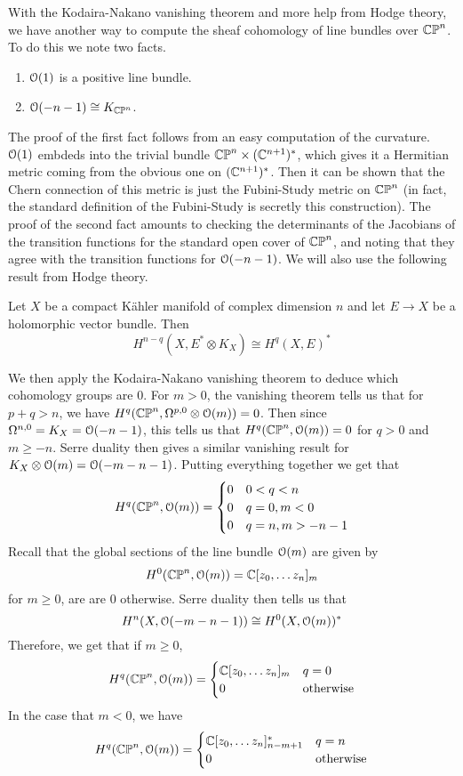 %
With the Kodaira-Nakano vanishing theorem and more help from Hodge theory, we have
another way to compute the sheaf cohomology of line bundles over $\mathbb{CP}^n$. To
do this we note two facts.
\begin{enumerate}
  \item $\mathcal{O}(1)$ is a positive line bundle.
  \item $\mathcal{O}(-n-1) \cong K_{\mathbb{CP}^n}$.
\end{enumerate}
%
The proof of the first fact follows from an easy computation of the curvature.
$\mathcal{O}(1)$ embdeds into the trivial bundle $\mathbb{CP}^n \times (\mathbb{C}^{n+1})^*$, which gives
it a Hermitian metric coming from the obvious one on $(\mathbb{C}^{n+1})^*$. Then it can be
shown that the Chern connection of this metric is just the Fubini-Study metric on
$\mathbb{CP}^n$ (in fact, the standard definition of the Fubini-Study is secretly
this construction). The proof of the second fact amounts to checking the
determinants of the Jacobians of the transition functions for the standard open
cover of $\mathbb{CP}^n$, and noting that they agree with the transition functions
for $\mathcal{O}(-n-1)$. We will also use the following result from Hodge theory.
%
\begin{thm}
Let $X$ be a compact K\"ahler manifold of complex dimension $n$ and let $E \to X$
be a holomorphic vector bundle.
Then
\[
H^{n-q}(X, E^*\otimes K_X) \cong H^q(X,E)^*
\]
\end{thm}
%
We then apply the Kodaira-Nakano vanishing theorem to deduce which cohomology
groups are $0$. For $m > 0$, the vanishing theorem tells us that for $p+q > n$, we have
$H^q(\mathbb{CP}^n,\Omega^{p,0} \otimes \mathcal{O}(m)) = 0$. Then since $\Omega^{n,0} = K_X = \mathcal{O}(-n-1)$,
this tells us that $H^q(\mathbb{CP}^n,\mathcal{O}(m)) = 0$ for $q > 0$ and $m \geq -n$. Serre duality
then gives a similar vanishing result for $K_X \otimes \mathcal{O}(m) = \mathcal{O}(-m-n-1)$.
Putting everything together we get that
\[
H^q(\mathbb{CP}^n,\mathcal{O}(m)) = \begin{cases}
0 & 0 < q < n \\
0 & q = 0, m < 0 \\
0 & q = n , m > -n-1
\end{cases}
\]
Recall that the global sections of the line bundle $\mathcal{O}(m)$ are given by
\[
H^0(\mathbb{CP}^n,\mathcal{O}(m)) = \mathbb{C}[z_0,\ldots z_n]_m
\]
for $m \geq 0$, are are $0$ otherwise. Serre duality then tells us that
\[
H^n(X, \mathcal{O}(-m - n - 1)) \cong H^0(X,\mathcal{O}(m))^*
\]
Therefore, we get that if $m \geq 0$,
\[
H^q(\mathbb{CP}^n, \mathcal{O}(m)) = \begin{cases}
\mathbb{C}[z_0,\ldots z_n]_m & q = 0 \\
0 & \text{otherwise}
\end{cases}
\]
In the case that $m < 0$, we have
\[
H^q(\mathbb{CP}^n, \mathcal{O}(m)) = \begin{cases}
\mathbb{C}[z_0,\ldots z_n]_{n-m+1}^* & q = n \\
0 & \text{otherwise}
\end{cases}
\]
%